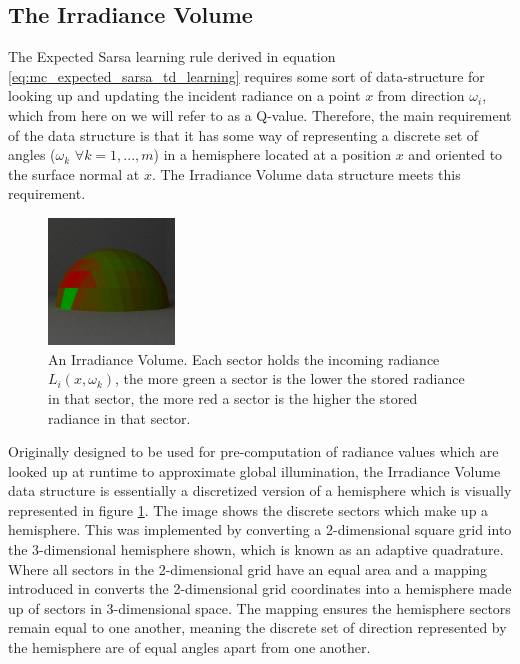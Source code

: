 \documentclass[../dissertation.tex]{subfiles}
\begin{document}
\subsection{The Irradiance Volume}
The Expected Sarsa learning rule derived in equation \ref{eq:mc_expected_sarsa_td_learning} requires some sort of data-structure for looking up and updating the incident radiance on a point $x$ from direction $\omega_i$, which from here on we will refer to as a Q-value. Therefore, the main requirement of the data structure is that it has some way of representing a discrete set of angles ($\omega_k$ $\forall k = 1, ..., m$) in a hemisphere located at a position $x$ and oriented to the surface normal at $x$. The Irradiance Volume data structure \cite{greger1998irradiance} meets this requirement.\\

\begin{figure}[h]
\begin{center}
\includegraphics[width=0.3\textwidth]{images/renders/hemispheres/irradiance_volume.png}    
\end{center}
\caption{An Irradiance Volume. Each sector holds the incoming radiance $L_i(x,\omega_k)$, the more green a sector is the lower the stored radiance in that sector, the more red a sector is the higher the stored radiance in that sector. }
\label{fig:irradiance_volume}
\end{figure}

Originally designed to be used for pre-computation of radiance values which are looked up at runtime to approximate global illumination, the Irradiance Volume data structure is essentially a discretized version of a hemisphere which is visually represented in figure \ref{fig:irradiance_volume}. The image shows the discrete sectors which make up a hemisphere. This was implemented by converting a 2-dimensional square grid into the 3-dimensional hemisphere shown, which is known as an adaptive quadrature. Where all sectors in the 2-dimensional grid have an equal area and a mapping introduced in \cite{shirley1994notes} converts the 2-dimensional grid coordinates into a hemisphere made up of sectors in 3-dimensional space. The mapping ensures the hemisphere sectors remain equal to one another, meaning the discrete set of direction represented by the hemisphere are of equal angles apart from one another.
\end{document}
